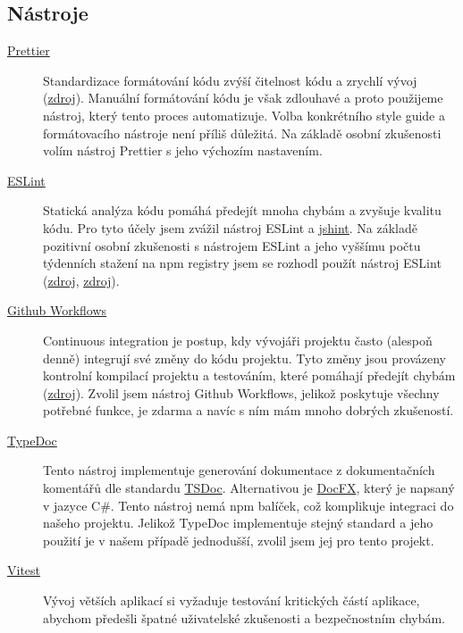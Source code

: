 \subsection{Nástroje}\label{subsec:nastroje}

\begin{description}
    \item[\href{https://prettier.io/}{Prettier}]
    Standardizace formátování kódu zvýší čitelnost kódu a zrychlí vývoj (\href{https://www.smashingmagazine.com/2012/10/why-coding-style-matters/}{zdroj}).
    Manuální formátování kódu je však zdlouhavé a proto použijeme nástroj, který tento proces automatizuje.
    Volba konkrétního style guide a formátovacího nástroje není příliš důležitá.
    Na základě osobní zkušenosti volím nástroj Prettier s jeho výchozím nastavením.
    \item[\href{https://eslint.org/}{ESLint}]
    Statická analýza kódu pomáhá předejít mnoha chybám a zvyšuje kvalitu kódu.
    Pro tyto účely jsem zvážil nástroj ESLint a \href{https://www.npmjs.com/package/jshint}{jshint}.
    Na základě pozitivní osobní zkušenosti s nástrojem ESLint a jeho vyššímu počtu týdenních stažení na npm registry jsem se rozhodl použít nástroj ESLint (\href{https://www.npmjs.com/package/eslint}{zdroj}, \href{https://www.npmjs.com/package/jshint}{zdroj}).
    \item[\href{https://github.com/features/actions}{Github Workflows}]
    Continuous integration je postup, kdy vývojáři projektu často (alespoň denně) integrují své změny do kódu projektu.
    Tyto změny jsou provázeny kontrolní kompilací projektu a testováním, které pomáhají předejít chybám (\href{https://martinfowler.com/articles/continuousIntegration.html}{zdroj}).
    Zvolil jsem nástroj Github Workflows, jelikož poskytuje všechny potřebné funkce, je zdarma a navíc s ním mám mnoho dobrých zkušeností.
    \item[\href{https://typedoc.org/}{TypeDoc}]
    Tento nástroj implementuje generování dokumentace z dokumentačních komentářů dle standardu \href{https://tsdoc.org/}{TSDoc}.
    Alternativou je \href{https://github.com/dotnet/docfx}{DocFX}, který je napsaný v jazyce C\#.
    Tento nástroj nemá npm balíček, což komplikuje integraci do našeho projektu.
    Jelikož TypeDoc implementuje stejný standard a jeho použití je v našem případě jednodušší, zvolil jsem jej pro tento projekt.
    \item[\href{https://vitest.dev/}{Vitest}]
    Vývoj větších aplikací si vyžaduje testování kritických částí aplikace, abychom předešli špatné uživatelské zkušenosti a bezpečnostním chybám.

\end{description}
